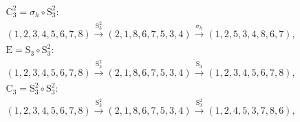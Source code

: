 \begin{align*}
& \mathrm{C}_{3}^{2} = \sigma_{h} \circ \mathrm{S}_{3}^{2}:\; \\& (1,2,3,4,5,6,7,8) \xrightarrow{\mathrm{S}_{3}^{2}} (2,1,8,6,7,5,3,4) \xrightarrow{\sigma_{h}} (1,2,5,3,4,8,6,7), \\
& \mathrm{E} = \mathrm{S}_{3} \circ \mathrm{S}_{3}^{2}:\; \\& (1,2,3,4,5,6,7,8) \xrightarrow{\mathrm{S}_{3}^{2}} (2,1,8,6,7,5,3,4) \xrightarrow{\mathrm{S}_{3}} (1,2,3,4,5,6,7,8), \\
& \mathrm{C}_{3} = \mathrm{S}_{3}^{2} \circ \mathrm{S}_{3}^{2}:\; \\& (1,2,3,4,5,6,7,8) \xrightarrow{\mathrm{S}_{3}^{2}} (2,1,8,6,7,5,3,4) \xrightarrow{\mathrm{S}_{3}^{2}} (1,2,4,5,3,7,8,6), \\
\end{align*}